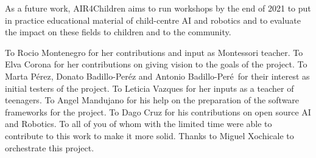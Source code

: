 \documentclass[sigconf]{acmart}
\begin{document}
As a future work, AIR4Children aims to run workshops by the end of 2021 to put in practice educational material of child-centre AI and robotics and to evaluate the impact on these fields to children and to the community. 


\begin{acks}
To Rocio Montenegro for her contributions and input as Montessori teacher. 
To Elva Corona for her contributions on giving vision to the goals of the project. 
To Marta P\'erez, Donato Badillo-Per\'ez and Antonio Badillo-Per\'e\ for their interest as initial testers of the project. 
To Leticia Vazques for her inputs as a teacher of teenagers. 
To Angel Mandujano for his help on the preparation of the software frameworks for the project. 
To Dago Cruz for his contributions on open source AI and Robotics.
To all of you of whom with the limited time were able to contribute to this work to make it more solid.
Thanks to Miguel Xochicale to orchestrate this project.
\end{acks}



\end{document}
